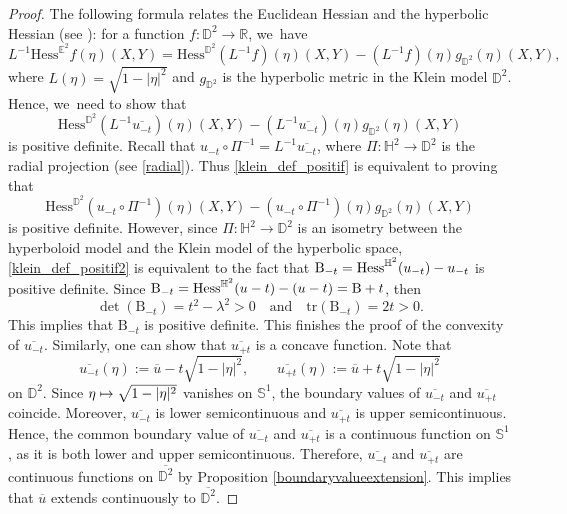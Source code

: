 \documentclass[11pt]{article}
\makeatletter
\newcommand\mto{\mathchoice{\longmapsto}{\mapsto}{\mapsto}{\mapsto}}
\DeclareRobustCommand{\mathbbm}[1]{\csname jepbb@#1\endcsname}
\theoremstyle{plain}
\theoremstyle{definition}
\newcommand{\hess}{\mathrm{Hess}^{\mathbb{H}^2}}
\newcommand{\B}{\mathrm{B}}
\makeatother
\begin{document}
\begin{proof}
The following formula relates the Euclidean Hessian and the hyperbolic Hessian (see \cite[Cor.\,2.7]{barbotfillastre}): for a function \(f: \mathbb{D}^2 \to \mathbb{R} \), we~have
\[
L^{-1} \mathrm{Hess}^{\mathbb{E}^2} f(\eta)(X,Y) = \mathrm{Hess}^{\mathbb{D}^2}(L^{-1} f)(\eta)(X,Y) - (L^{-1} f)(\eta) g_{\mathbb{D}^2}(\eta)(X,Y),
\]
where \(L(\eta) = \sqrt{1 - \lvert \eta \rvert^2} \) and \(g_{\mathbb{D}^2} \) is the hyperbolic metric in the Klein model \(\mathbb{D}^2\). Hence, we~need to show that
\begin{equation}\label{klein_def_positif}
\mathrm{Hess}^{\mathbb{D}^2}(L^{-1} \overline{u_{{-t}}})(\eta)(X,Y) - (L^{-1} \overline{u_{{-t}}})(\eta) g_{\mathbb{D}^2}(\eta)(X,Y)
\end{equation}
is positive definite. Recall that \(u_{-t} \circ \Pi^{-1} = L^{-1} \overline{u_{-t}} \), where \(\Pi: \mathbb{H}^2 \to \mathbb{D}^2 \) is the radial projection (see \eqref{radial}). Thus \eqref{klein_def_positif} is equivalent to proving that
\begin{equation}\label{klein_def_positif2}
\mathrm{Hess}^{\mathbb{D}^2}(u_{-t} \circ \Pi^{-1})(\eta)(X,Y) - (u_{-t} \circ \Pi^{-1})(\eta) g_{\mathbb{D}^2}(\eta)(X,Y)
\end{equation}
is positive definite. However, since \(\Pi: \mathbb{H}^2 \to \mathbb{D}^2\) is an isometry between the hyperboloid model and the Klein model of the hyperbolic space, \eqref{klein_def_positif2} is equivalent to the fact that \(\B_{{-t}} = \hess(u_{-t}) - u_{-t} \mathbbm{1} \) is positive definite. Since \(\B_{{-t}} = \hess(u - t) - (u - t) \mathbbm{1} = \B + t \mathbbm{1} \), then
\[
\det(\B_{{-t}}) = t^2 - \lambda^2 > 0 \quad \text{and} \quad \mathrm{tr}(\B_{{-t}}) = 2t > 0.
\]
This implies that \(\B_{{-t}} \) is positive definite. This finishes the proof of the convexity of \(\overline{u_{{-t}}} \). Similarly, one can show that \(\overline{u_{{+t}}} \) is a concave function.
Note that
\[
\overline{u_{-t}}(\eta) := \overline{u} - t\sqrt{1-\lvert\eta\rvert^2}, \qquad \overline{u_{+t}}(\eta) := \overline{u} +t\sqrt{1-\lvert\eta\rvert^2}
\]
on $\mathbb{D}^2$. Since $\eta\mto\sqrt{1-\lvert\eta\rvert^2}$ vanishes on $\mathbb{S}^1$, the boundary values of $\overline{u_{-t}}$ and $\overline{u_{+t}}$ coincide. Moreover, $\overline{u_{-t}}$ is lower semicontinuous and $\overline{u_{+t}}$ is upper semicontinuous. Hence, the common boundary value of $\overline{u_{-t}}$ and $\overline{u_{+t}}$ is a continuous function on $\mathbb{S}^1$, as it is both lower and upper semicontinuous. Therefore, $\overline{u_{-t}}$ and $\overline{u_{+t}}$ are continuous functions on $\overline{\mathbb{D}^2}$ by Proposition \ref{boundaryvalueextension}. This implies that $\overline{u}$ extends continuously to $\overline{\mathbb{D}^2}$.\end{proof}
\end{document}
